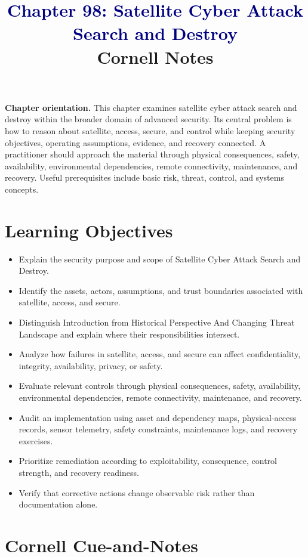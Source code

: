 \documentclass[11pt]{article}
\title{\textcolor{Navy}{Chapter 98: Satellite Cyber Attack Search and Destroy}\\[2mm]\large Cornell Notes}
\author{}
\date{}
\begin{document}
\maketitle
\thispagestyle{fancy}
\vspace{-1.5em}
\begin{orientationbox}
\textbf{Chapter orientation.} This chapter examines satellite cyber attack search and destroy within the broader domain of advanced security. Its central problem is how to reason about satellite, access, secure, and control while keeping security objectives, operating assumptions, evidence, and recovery connected. A practitioner should approach the material through physical consequences, safety, availability, environmental dependencies, remote connectivity, maintenance, and recovery. Useful prerequisites include basic risk, threat, control, and systems concepts.
\end{orientationbox}
\section*{Learning Objectives}
\begin{itemize}
\item Explain the security purpose and scope of Satellite Cyber Attack Search and Destroy.
\item Identify the assets, actors, assumptions, and trust boundaries associated with satellite, access, and secure.
\item Distinguish Introduction from Historical Perspective And Changing Threat Landscape and explain where their responsibilities intersect.
\item Analyze how failures in satellite, access, and secure can affect confidentiality, integrity, availability, privacy, or safety.
\item Evaluate relevant controls through physical consequences, safety, availability, environmental dependencies, remote connectivity, maintenance, and recovery.
\item Audit an implementation using asset and dependency maps, physical-access records, sensor telemetry, safety constraints, maintenance logs, and recovery exercises.
\item Prioritize remediation according to exploitability, consequence, control strength, and recovery readiness.
\item Verify that corrective actions change observable risk rather than documentation alone.
\end{itemize}
\section*{Cornell Cue-and-Notes}
\end{document}
